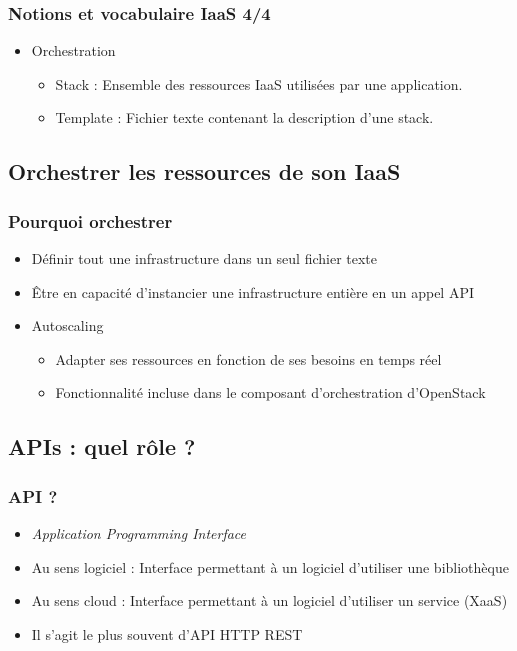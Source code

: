   \begin{frame}
    \frametitle{Notions et vocabulaire IaaS 4/4}
    \begin{itemize}
      \item Orchestration \pause
      \begin{itemize}
        \item Stack : Ensemble des ressources IaaS utilisées par une application. \pause
        \item Template : Fichier texte contenant la description d'une stack.
      \end{itemize}
    \end{itemize}
  \end{frame}

  \subsection[Orchestration]{Orchestrer les ressources de son IaaS}

  \begin{frame}
    \frametitle{Pourquoi orchestrer}
    \begin{itemize}
      \item Définir tout une infrastructure dans un seul fichier texte
      \item Être en capacité d'instancier une infrastructure entière en un appel API
      \item Autoscaling
      \begin{itemize}
        \item Adapter ses ressources en fonction de ses besoins en temps réel
        \item Fonctionnalité incluse dans le composant d'orchestration d'OpenStack
      \end{itemize}
    \end{itemize}
  \end{frame}

  \subsection[APIs]{APIs : quel rôle ?}

  \begin{frame}
    \frametitle{API ?}
    \begin{itemize}
      \item \textit{Application Programming Interface}
      \item Au sens logiciel : Interface permettant à un logiciel d'utiliser une bibliothèque
      \item Au sens cloud : Interface permettant à un logiciel d'utiliser un service (XaaS)
      \item Il s'agit le plus souvent d'API HTTP REST
    \end{itemize}
  \end{frame}

